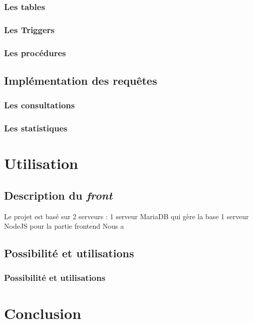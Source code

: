 \documentclass[10pt]{article}
\begin{document}
  \subsubsection{Les tables}
  \subsubsection{Les Triggers}
  \subsubsection{Les procédures}
  
  \subsection{Implémentation des requêtes}\label{subsec:requete}
  \subsubsection{Les consultations}
  \subsubsection{Les statistiques}
  
  \section{Utilisation}\label{sec:utili}
  \subsection{Description du \textit{front}}\label{subsec:desc}
  Le projet est basé sur 2 serveurs :
  1 serveur MariaDB qui gère la base
  1 serveur NodeJS pour la partie frontend
  Nous a
  \subsection{Possibilité et utilisations}\label{subsec:possib}
  \subsubsection{Possibilité et utilisations}\label{subsec:possib}

  \section{Conclusion}\label{sec:ccl}
\end{document}

